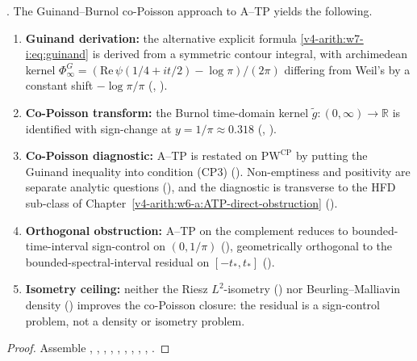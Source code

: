 \begin{theorem}
\label{v4-arith:w7-i:thm:wave7-form}
\ClaimStatusProvedHere. The Guinand--Burnol co-Poisson approach to
A--TP yields the following.

\begin{enumerate}
\item \textbf{Guinand derivation:} the alternative explicit formula
\eqref{v4-arith:w7-i:eq:guinand} is derived from a symmetric contour
integral, with archimedean kernel
\(\Phi_{\infty}^{G}=(\mathrm{Re}\,\psi(1/4+it/2)-\log\pi)/(2\pi)\)
differing from Weil's by a constant shift \(-\log\pi/\pi\)
(,
).

\item \textbf{Co-Poisson transform:} the Burnol time-domain kernel
\(\widetilde g\colon(0,\infty)\to\mathbb{R}\) is identified with
sign-change at \(y=1/\pi\approx 0.318\)
(,
).

\item \textbf{Co-Poisson diagnostic:} A--TP is restated on
\(\mathrm{PW}^{\mathrm{CP}}\) by putting the Guinand inequality into
condition (CP3)
(). Non-emptiness and
positivity are separate analytic questions
(), and the diagnostic is
transverse to the HFD
sub-class of Chapter~\ref{v4-arith:w6-a:ATP-direct-obstruction}
().

\item \textbf{Orthogonal obstruction:} A--TP on the complement
reduces to bounded-time-interval sign-control on \((0,1/\pi)\)
(), geometrically orthogonal
to the bounded-spectral-interval residual on \([-t_{\ast},t_{\ast}]\)
().

\item \textbf{Isometry ceiling:} neither the Riesz \(L^{2}\)-isometry
() nor
Beurling--Malliavin density ()
improves the co-Poisson closure: the residual is a sign-control
problem, not a density or isometry problem.
\end{enumerate}
\end{theorem}

\begin{proof}
Assemble
,
,
,
,
,
,
,
,
,
.
\end{proof}

